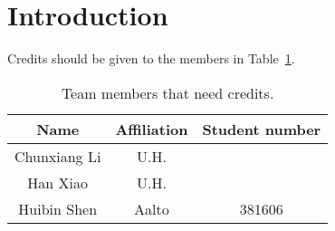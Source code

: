 
\section{Introduction}

Credits should be given to the members in Table~\ref{member_credit}.

\begin{table}[ht]
	\begin{center}
		\begin{tabular}{|c|c|c|} \hline
			\textbf{Name} & \textbf{Affiliation} & \textbf{Student number} \\ \hline
			Chunxiang Li & U.H. & \\ \hline
			Han Xiao & U.H. & \\ \hline
			Huibin Shen & Aalto & 381606 \\ \hline
		\end{tabular}
	\end{center}
	\caption{Team members that need credits.}
	\label{member_credit}
\end{table}
